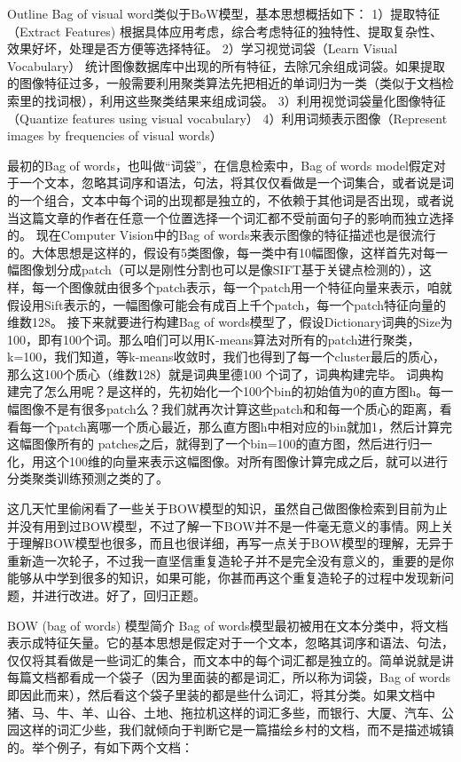 \documentclass[10pt,a4paper]{ctexbook}
\begin{document}
Outline
 Bag of visual word类似于BoW模型，基本思想概括如下：
 1）提取特征（Extract Features)
 根据具体应用考虑，综合考虑特征的独特性、提取复杂性、效果好坏，处理是否方便等选择特征。
 2）学习视觉词袋（Learn Visual Vocabulary）
 统计图像数据库中出现的所有特征，去除冗余组成词袋。如果提取的图像特征过多，一般需要利用聚类算法先把相近的单词归为一类（类似于文档检索里的找词根），利用这些聚类结果来组成词袋。
 3）利用视觉词袋量化图像特征（Quantize features using visual vocabulary）
 4）利用词频表示图像（Represent images by frequencies of visual words）




最初的Bag of words，也叫做“词袋”，在信息检索中，Bag of words model假定对于一个文本，忽略其词序和语法，句法，将其仅仅看做是一个词集合，或者说是词的一个组合，文本中每个词的出现都是独立的，不依赖于其他词是否出现，或者说当这篇文章的作者在任意一个位置选择一个词汇都不受前面句子的影响而独立选择的。
       现在Computer Vision中的Bag of words来表示图像的特征描述也是很流行的。大体思想是这样的，假设有5类图像，每一类中有10幅图像，这样首先对每一幅图像划分成patch（可以是刚性分割也可以是像SIFT基于关键点检测的），这样，每一个图像就由很多个patch表示，每一个patch用一个特征向量来表示，咱就假设用Sift表示的，一幅图像可能会有成百上千个patch，每一个patch特征向量的维数128。
      接下来就要进行构建Bag of words模型了，假设Dictionary词典的Size为100，即有100个词。那么咱们可以用K-means算法对所有的patch进行聚类，k=100，我们知道，等k-means收敛时，我们也得到了每一个cluster最后的质心，那么这100个质心（维数128）就是词典里德100 个词了，词典构建完毕。
      词典构建完了怎么用呢？是这样的，先初始化一个100个bin的初始值为0的直方图h。每一幅图像不是有很多patch么？我们就再次计算这些patch和和每一个质心的距离，看看每一个patch离哪一个质心最近，那么直方图h中相对应的bin就加1，然后计算完这幅图像所有的 patches之后，就得到了一个bin=100的直方图，然后进行归一化，用这个100维的向量来表示这幅图像。对所有图像计算完成之后，就可以进行分类聚类训练预测之类的了。




这几天忙里偷闲看了一些关于BOW模型的知识，虽然自己做图像检索到目前为止并没有用到过BOW模型，不过了解一下BOW并不是一件毫无意义的事情。网上关于理解BOW模型也很多，而且也很详细，再写一点关于BOW模型的理解，无异于重新造一次轮子，不过我一直坚信重复造轮子并不是完全没有意义的，重要的是你能够从中学到很多的知识，如果可能，你甚而再这个重复造轮子的过程中发现新问题，并进行改进。好了，回归正题。

 

BOW (bag of words) 模型简介
Bag of words模型最初被用在文本分类中，将文档表示成特征矢量。它的基本思想是假定对于一个文本，忽略其词序和语法、句法，仅仅将其看做是一些词汇的集合，而文本中的每个词汇都是独立的。简单说就是讲每篇文档都看成一个袋子（因为里面装的都是词汇，所以称为词袋，Bag of words即因此而来），然后看这个袋子里装的都是些什么词汇，将其分类。如果文档中猪、马、牛、羊、山谷、土地、拖拉机这样的词汇多些，而银行、大厦、汽车、公园这样的词汇少些，我们就倾向于判断它是一篇描绘乡村的文档，而不是描述城镇的。举个例子，有如下两个文档：
\end{document}
